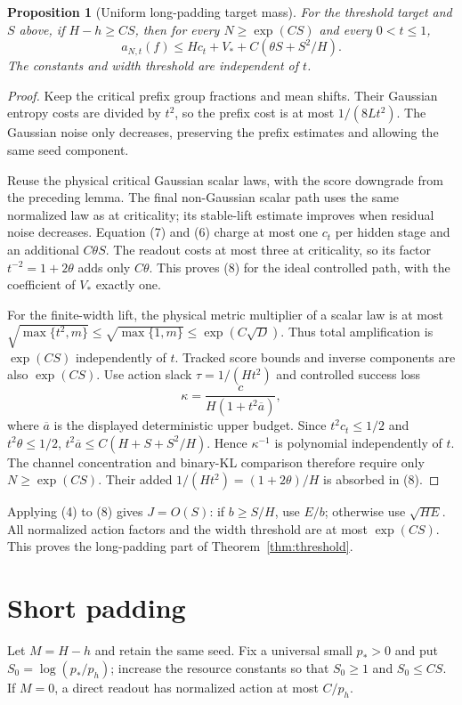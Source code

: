 \documentclass[11pt]{article}
\newtheorem{proposition}[theorem]{Proposition}
\theoremstyle{remark}\newtheorem{remark}[theorem]{Remark}
\begin{document}
\begin{proposition}[Uniform long-padding target mass]
\label{prop:long}
For the threshold target and $S$ above, if $H-h\ge CS$, then for
every $N\ge\exp(CS)$ and every $0<t\le1$,
\[
 a_{N,t}(f)\le Hc_t+V_*+C(\theta S+S^2/H).          \tag{8}
\]
The constants and width threshold are independent of $t$.
\end{proposition}
\begin{proof}
Keep the critical prefix group fractions and mean shifts. Their
Gaussian entropy costs are divided by $t^2$, so the prefix cost is
at most $1/(8Lt^2)$. The Gaussian noise only decreases, preserving
the prefix estimates and allowing the same seed component.

Reuse the physical critical Gaussian scalar laws, with the score
downgrade from the preceding lemma. The final non-Gaussian scalar
path uses the same normalized law as at criticality; its stable-lift
estimate improves when residual noise decreases. Equation (7) and
(6) charge at most one $c_t$ per hidden stage and an additional
$C\theta S$. The readout costs at most three at criticality, so its
factor $t^{-2}=1+2\theta$ adds only $C\theta$. This proves (8) for
the ideal controlled path, with the coefficient of $V_*$ exactly one.

For the finite-width lift, the physical metric multiplier of a
scalar law is at most $\sqrt{\max\{t^2,m\}}\le
\sqrt{\max\{1,m\}}\le\exp(C\sqrt D)$. Thus total amplification
is $\exp(CS)$ independently of $t$. Tracked score bounds and
inverse components are also $\exp(CS)$.
Use action slack $\tau=1/(Ht^2)$ and controlled success loss
\[
 \kappa=\frac{c}{H(1+t^2\overline a)},
\]
where $\overline a$ is the displayed deterministic upper budget.
Since $t^2c_t\le1/2$ and $t^2\theta\le1/2$,
$t^2\overline a\le C(H+S+S^2/H)$. Hence $\kappa^{-1}$ is
polynomial independently of $t$. The channel concentration and
binary-KL comparison therefore require only $N\ge\exp(CS)$.
Their added $1/(Ht^2)=(1+2\theta)/H$ is absorbed in (8).
\end{proof}

Applying (4) to (8) gives $J=O(S)$: if $b\ge S/H$, use $E/b$;
otherwise use $\sqrt{HE}$. All normalized action factors and the
width threshold are at most $\exp(CS)$. This proves the long-padding
part of Theorem~\ref{thm:threshold}.

\section{Short padding}
Let $M=H-h$ and retain the same seed. Fix a universal small
$p_*>0$ and put $S_0=\log(p_*/p_h)$; increase the resource constants
so that $S_0\ge1$ and $S_0\le CS$. If $M=0$, a direct readout has
normalized action at most $C/p_h$.
\end{document}
